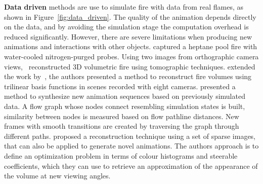 \textbf{Data driven} methods are use to simulate fire with data from real flames, as shown in Figure~\ref{fig:data_driven}.
The quality of the animation depends directly on the data, and by avoiding the simulation stage the computation overhead is reduced significantly.
However, there are severe limitations when producing new animations and interactions with other objects.
\cite{Rushmeier:1995} captured a heptane pool fire with water-cooled nitrogen-purged probes.
Using two images from orthographic camera views,~\cite{Hasinoff:2003} reconstructed 3D volumetric fire using tomographic techniques.
\cite{Ihrke:2004} extended the work by~\cite{Hasinoff:2003}, the authors presented a method to reconstruct fire volumes using trilinear basis functions in scenes recorded with eight cameras.
\cite{Zhang:2011} presented a method to synthesize new animation sequences based on previously simulated data.
A flow graph whose nodes connect resembling simulation states is built, similarity between nodes is measured based on flow pathline distances.
New frames with smooth transitions are created by traversing the graph through different paths.
\cite{Okabe:2015} proposed a reconstruction technique using a set of sparse images, that can also be applied to generate novel animations.
The authors approach is to define an optimization problem in terms of colour histograms and steerable coefficients, which they can use to retrieve an approximation of the appearance of the volume at new viewing angles.

